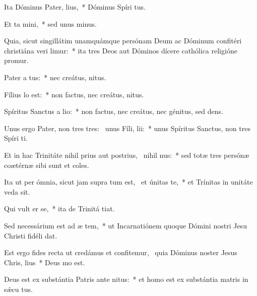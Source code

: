 \item Ita Dóminus Pater,  lius,~* Dóminus Spíri tus.
\item Et ta   mini,~* sed unus  minus.
\item Quia, sicut singillátim unamquámque persónam Deum ac Dóminum confitéri christiána veri limur:~* ita tres Deos aut Dóminos dícere cathólica religióne promur.
\item Pater a   tus:~* nec creátus,  nitus.
\item Fílius   lo est:~* non factus, nec creátus,  nitus.
\item Spíritus Sanctus a   lio:~* non factus, nec creátus, nec génitus, sed dens.
\item Unus ergo Pater, non tres tres:~\pscross{} unus Fíli,   lii:~* unus Spíritus Sanctus, non tres Spíri ti.
\item Et in hac Trinitáte nihil prius aut postrius,~\pscross{} nihil   nus:~* sed totæ tres persónæ coætérnæ sibi sunt et coles.
\item Ita ut per ómnia, sicut jam supra tum est,~\pscross{} et únitas  te,~* et Trínitas in unitáte veda sit.
\item Qui vult er  se,~* ita de Trinitá tiat.
\item Sed necessárium est ad æ tem,~* ut Incarnatiónem quoque Dómini nostri Jesu Christi fidéli dat.
\item Est ergo fides recta ut credámus et confitemur,~\pscross{} quia Dóminus noster Jesus Chris,  lius~* Deus  mo est.
\item Deus est ex substántia Patris ante  nitus:~* et homo est ex substántia matris in sǽcu tus.
